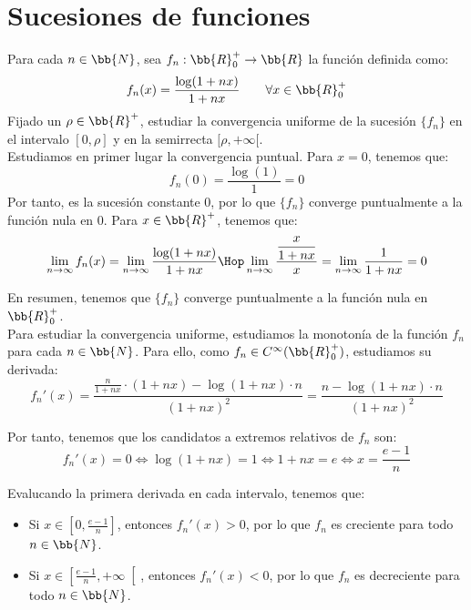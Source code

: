 \section{Sucesiones de funciones}

\begin{ejercicio}
    Para cada $n\in \bb{N}$, sea $f_n:\bb{R}^+_0\to \bb{R}$ 
    la función definida como:
    \begin{equation*}
        f_n(x) = \frac{\log(1+nx)}{1+nx} \qquad \forall x\in \bb{R}^+_0
    \end{equation*}
    Fijado un $\rho\in \bb{R}^+$, estudiar la convergencia uniforme de la sucesión
    $\{f_n\}$ en el intervalo $[0,\rho]$ y en la semirrecta $[\rho,+\infty[$.\\

    Estudiamos en primer lugar la convergencia puntual. Para $x=0$, tenemos que:
    \begin{equation*}
        f_n(0) = \frac{\log(1)}{1} = 0
    \end{equation*}
    Por tanto, es la sucesión constante $0$, por lo que $\{f_n\}$ converge puntualmente a la función nula en $0$.
    Para $x\in \bb{R}^+$, tenemos que:
    \begin{equation*}
        \lim_{n\to \infty} f_n(x) = \lim_{n\to \infty} \frac{\log(1+nx)}{1+nx} \Hop
        \lim_{n\to \infty} \frac{\dfrac{x}{1+nx}}{x} =
        \lim_{n\to \infty} \frac{1}{1+nx} = 0
    \end{equation*}

    En resumen, tenemos que $\{f_n\}$ converge puntualmente a la función nula en $\bb{R}^+_0$.\\

    Para estudiar la convergencia uniforme, estudiamos la monotonía de la función $f_n$
    para cada $n\in \bb{N}$. Para ello, como $f_n\in C^\infty(\bb{R}^+_0)$, estudiamos
    su derivada:
    \begin{equation*}
        f_n'(x) = \frac{\frac{n}{1+nx}\cdot (1+nx) - \log(1+nx)\cdot n}{(1+nx)^2} =
        \frac{n - \log(1+nx)\cdot n}{(1+nx)^2}
    \end{equation*}

    Por tanto, tenemos que los candidatos a extremos relativos de $f_n$ son:
    \begin{equation*}
        f_n'(x) = 0 \iff \log(1+nx) = 1 \iff 1+nx = e \iff x = \frac{e-1}{n}
    \end{equation*}

    Evalucando la primera derivada en cada intervalo, tenemos que:
    \begin{itemize}
        \item Si $x\in \left[0,\frac{e-1}{n}\right]$, entonces $f_n'(x) > 0$, por lo que $f_n$ es creciente para todo $n\in \bb{N}$.
        \item Si $x\in \left[\frac{e-1}{n},+\infty\right[$, entonces $f_n'(x) < 0$, por lo que $f_n$ es decreciente para todo $n\in \bb{N}$.
    \end{itemize}
    

\end{ejercicio}

